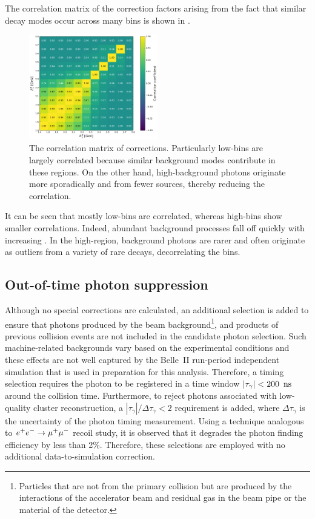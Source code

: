 The correlation matrix of the correction factors arising from the fact that similar decay modes occur across many bins is shown in .
\begin{figure}[htbp!]
    \centering
    \includegraphics[width=0.5\textwidth]{figures/data_sim_corrections/bbar_correlation_matrix.pdf}
    \caption{\label{fig:bbar_correlation_matrix} The correlation matrix of \BB corrections.
    Particularly low-\EB bins are largely correlated because similar background modes contribute in these regions.
    On the other hand, high-\EB background photons originate more sporadically and from fewer sources, thereby reducing the correlation.
    }
\end{figure}
It can be seen that mostly low-\EB bins are correlated, whereas high-\EB bins show smaller correlations.
Indeed, abundant background processes fall off quickly with increasing \EB.
In the high-\EB region, background photons are rarer and often originate as outliers from a variety of rare decays, decorrelating the bins.

\subsection{Out-of-time photon suppression}\label{sec:out_of_time_photon_suppression}

Although no special corrections are calculated, an additional selection is added to ensure that photons produced by the beam background\footnote{
Particles that are not from the primary collision but are produced by the interactions of the accelerator beam 
and residual gas in the beam pipe or the material of the detector.},
and products of previous collision events are not included in the candidate photon selection.
Such machine-related backgrounds vary based on the experimental conditions and these effects are not well captured by the Belle~II run-period independent simulation that is used in preparation for this analysis.
Therefore, a timing selection requires the photon to be registered in a time window $|\tau_{\gamma}|<200~{\rm \,ns}$ around the collision time.
Furthermore, to reject photons associated with low-quality cluster reconstruction, a $|\tau_{\gamma}|/\Delta\tau_{\gamma}<2$ requirement is added, 
where $\Delta\tau_{\gamma}$ is the uncertainty of the photon timing measurement.
Using a technique analogous to $e^+e^-\rightarrow\mu^+\mu^-$ recoil study, it is observed that it degrades the photon finding efficiency by less than 2\%.
Therefore, these selections are employed with no additional data-to-simulation correction.